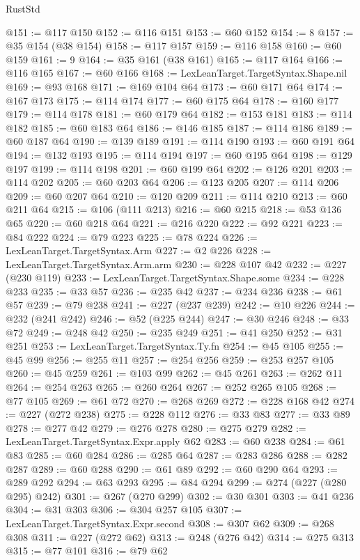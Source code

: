\begin{lexlean}{RustStd}
\begin{coremodule}
{\begin{coremodule}
{{{{{{{{{{{{{{{{{{{{{{{{{{{{{@151 := @117 @150
@152 := @116 @151
@153 := @60 @152
@154 := 8
@157 := @35 @154 (@38 @154)
@158 := @117 @157
@159 := @116 @158
@160 := @60 @159
@161 := 9
@164 := @35 @161 (@38 @161)
@165 := @117 @164
@166 := @116 @165
@167 := @60 @166
@168 := LexLeanTarget.TargetSyntax.Shape.nil
@169 := @93 @168
@171 := @169 @104 @64
@173 := @60 @171 @64
@174 := @167 @173
@175 := @114 @174
@177 := @60 @175 @64
@178 := @160 @177
@179 := @114 @178
@181 := @60 @179 @64
@182 := @153 @181
@183 := @114 @182
@185 := @60 @183 @64
@186 := @146 @185
@187 := @114 @186
@189 := @60 @187 @64
@190 := @139 @189
@191 := @114 @190
@193 := @60 @191 @64
@194 := @132 @193
@195 := @114 @194
@197 := @60 @195 @64
@198 := @129 @197
@199 := @114 @198
@201 := @60 @199 @64
@202 := @126 @201
@203 := @114 @202
@205 := @60 @203 @64
@206 := @123 @205
@207 := @114 @206
@209 := @60 @207 @64
@210 := @120 @209
@211 := @114 @210
@213 := @60 @211 @64
@215 := @106 (@111 @213)
@216 := @60 @215
@218 := @53 @136 @65
@220 := @60 @218 @64
@221 := @216 @220
@222 := @92 @221
@223 := @84 @222
@224 := @79 @223
@225 := @78 @224
@226 := LexLeanTarget.TargetSyntax.Arm
@227 := @2 @226
@228 := LexLeanTarget.TargetSyntax.Arm.arm
@230 := @228 @107 @42
@232 := @227 (@230 @119)
@233 := LexLeanTarget.TargetSyntax.Shape.some
@234 := @228 @233
@235 := @33 @57
@236 := @235 @42
@237 := @234 @236
@238 := @61 @57
@239 := @79 @238
@241 := @227 (@237 @239)
@242 := @10 @226
@244 := @232 (@241 @242)
@246 := @52 (@225 @244)
@247 := @30 @246
@248 := @33 @72
@249 := @248 @42
@250 := @235 @249
@251 := @41 @250
@252 := @31 @251
@253 := LexLeanTarget.TargetSyntax.Ty.fn
@254 := @45 @105
@255 := @45 @99
@256 := @255 @11
@257 := @254 @256
@259 := @253 @257 @105
@260 := @45 @259
@261 := @103 @99
@262 := @45 @261
@263 := @262 @11
@264 := @254 @263
@265 := @260 @264
@267 := @252 @265 @105
@268 := @77 @105
@269 := @61 @72
@270 := @268 @269
@272 := @228 @168 @42
@274 := @227 (@272 @238)
@275 := @228 @112
@276 := @33 @83
@277 := @33 @89
@278 := @277 @42
@279 := @276 @278
@280 := @275 @279
@282 := LexLeanTarget.TargetSyntax.Expr.apply @62
@283 := @60 @238
@284 := @61 @83
@285 := @60 @284
@286 := @285 @64
@287 := @283 @286
@288 := @282 @287
@289 := @60 @288
@290 := @61 @89
@292 := @60 @290 @64
@293 := @289 @292
@294 := @63 @293
@295 := @84 @294
@299 := @274 (@227 (@280 @295) @242)
@301 := @267 (@270 @299)
@302 := @30 @301
@303 := @41 @236
@304 := @31 @303
@306 := @304 @257 @105
@307 := LexLeanTarget.TargetSyntax.Expr.second
@308 := @307 @62
@309 := @268 @308
@311 := @227 (@272 @62)
@313 := @248 (@276 @42)
@314 := @275 @313
@315 := @77 @101
@316 := @79 @62
}}}}}}}}}}}}}}}}}}}}}}}}}}}}}
\end{coremodule}}
\end{coremodule}
\end{lexlean}
